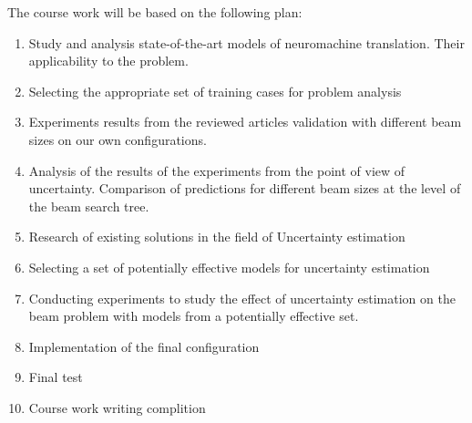 \documentclass[a4paper,14pt]{extarticle}
\begin{document}
	The course work will be based on the following plan:
	\begin{enumerate}
		\item Study and analysis state-of-the-art models of neuromachine translation. Their applicability to the problem.
		\item Selecting the appropriate set of training cases for problem analysis
		\item Experiments results from the reviewed articles validation with different beam sizes on our own configurations.
		\item Analysis of the results of the experiments from the point of view of uncertainty. Comparison of predictions for different beam sizes at the level of the beam search tree.
		\item Research of existing solutions in the field of Uncertainty estimation
		\item Selecting a set of potentially effective models for uncertainty estimation
		\item Conducting experiments to study the effect of uncertainty estimation on the beam problem with models from a potentially effective set.
		\item Implementation of the final configuration
		\item Final test
		\item Course work writing complition
	\end{enumerate}
	
\end{document}
